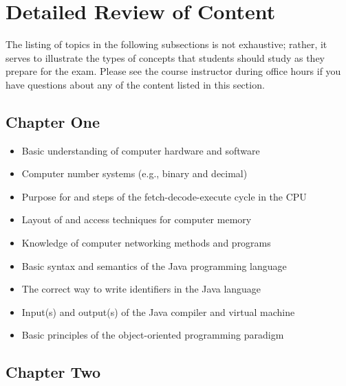 \vspace*{-.15in}
\section*{Detailed Review of Content}
\vspace*{-.1in}

The listing of topics in the following subsections is not exhaustive; rather, it serves to illustrate the types of
concepts that students should study as they prepare for the exam. Please see the course instructor during office hours
if you have questions about any of the content listed in this section.

\vspace*{-.1in}
\subsection*{Chapter One}

\begin{itemize}

  \itemsep -.015in
  \item Basic understanding of computer hardware and software
  \item Computer number systems (e.g., binary and decimal)
  \item Purpose for and steps of the fetch-decode-execute cycle in the CPU
  \item Layout of and access techniques for computer memory
  \item Knowledge of computer networking methods and programs
  \item Basic syntax and semantics of the Java programming language
  \item The correct way to write identifiers in the Java language
  \item Input(s) and output(s) of the Java compiler and virtual machine
  \item Basic principles of the object-oriented programming paradigm

\end{itemize}

\vspace*{-.2in}
\subsection*{Chapter Two}
\vspace*{-.1in}

